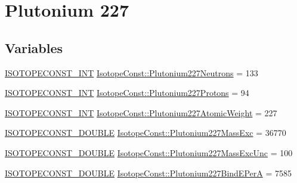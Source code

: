\hypertarget{group___isotope_const-_plutonium-_pu227}{}\section{Plutonium 227}
\label{group___isotope_const-_plutonium-_pu227}
\subsection*{Variables}
\begin{DoxyCompactItemize}
\item 
\mbox{\hyperlink{group___isotope_const-_macros_ga5f18360b3e99483a35c32d789e62621c}{I\+S\+O\+T\+O\+P\+E\+C\+O\+N\+S\+T\+\_\+\+I\+NT}} \mbox{\hyperlink{group___isotope_const-_plutonium-_pu227_ga00aade85aabf984db063d71373e7d837}{Isotope\+Const\+::\+Plutonium227\+Neutrons}} = 133
\item 
\mbox{\hyperlink{group___isotope_const-_macros_ga5f18360b3e99483a35c32d789e62621c}{I\+S\+O\+T\+O\+P\+E\+C\+O\+N\+S\+T\+\_\+\+I\+NT}} \mbox{\hyperlink{group___isotope_const-_plutonium-_pu227_ga15ee5960ec95930c79aac9730a3cde9e}{Isotope\+Const\+::\+Plutonium227\+Protons}} = 94
\item 
\mbox{\hyperlink{group___isotope_const-_macros_ga5f18360b3e99483a35c32d789e62621c}{I\+S\+O\+T\+O\+P\+E\+C\+O\+N\+S\+T\+\_\+\+I\+NT}} \mbox{\hyperlink{group___isotope_const-_plutonium-_pu227_gaafb830cde0220cd157e83ccc943cc792}{Isotope\+Const\+::\+Plutonium227\+Atomic\+Weight}} = 227
\item 
\mbox{\hyperlink{group___isotope_const-_macros_ga8f45a7272ce02c0b4c65c44636ed719a}{I\+S\+O\+T\+O\+P\+E\+C\+O\+N\+S\+T\+\_\+\+D\+O\+U\+B\+LE}} \mbox{\hyperlink{group___isotope_const-_plutonium-_pu227_gac644299cdc8e73216b31b603eb347e20}{Isotope\+Const\+::\+Plutonium227\+Mass\+Exc}} = 36770
\item 
\mbox{\hyperlink{group___isotope_const-_macros_ga8f45a7272ce02c0b4c65c44636ed719a}{I\+S\+O\+T\+O\+P\+E\+C\+O\+N\+S\+T\+\_\+\+D\+O\+U\+B\+LE}} \mbox{\hyperlink{group___isotope_const-_plutonium-_pu227_ga1d04fc6ae9d69828b6efa229cd6569f2}{Isotope\+Const\+::\+Plutonium227\+Mass\+Exc\+Unc}} = 100
\item 
\mbox{\hyperlink{group___isotope_const-_macros_ga8f45a7272ce02c0b4c65c44636ed719a}{I\+S\+O\+T\+O\+P\+E\+C\+O\+N\+S\+T\+\_\+\+D\+O\+U\+B\+LE}} \mbox{\hyperlink{group___isotope_const-_plutonium-_pu227_gaf7604fcd60661aa73b2ee18d7ec5b25f}{Isotope\+Const\+::\+Plutonium227\+Bind\+E\+PerA}} = 7585
\item 

\end{DoxyCompactItemize}
